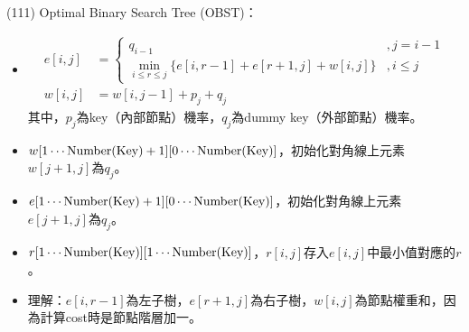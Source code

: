 \item \begin{theorem}{(111)} Optimal Binary Search Tree (OBST)：\begin{itemize}
        \item \begin{equation}
            \begin{aligned}
                e[i, j] & = \begin{cases}
                    q_{i - 1} &, j = i - 1 \\
                    \min_{i \le r \le j}\{e[i, r - 1] + e[r + 1, j] + w[i, j]\} &, i \le j
                \end{cases} \\
                w[i, j] & = w[i, j - 1] + p_j + q_j
            \end{aligned}
        \end{equation} 其中，$p_j$為key（內部節點）機率，$q_j$為dummy key（外部節點）機率。
        \item $w[1 \cdots \operatorname{Number}(\text{Key}) + 1][0 \cdots \operatorname{Number}(\text{Key})]$，初始化對角線上元素$w[j + 1, j]$為$q_j$。
        \item $e[1 \cdots \operatorname{Number}(\text{Key}) + 1][0 \cdots \operatorname{Number}(\text{Key})]$，初始化對角線上元素$e[j + 1, j]$為$q_j$。
        \item $r[1 \cdots \operatorname{Number}(\text{Key})][1 \cdots \operatorname{Number}(\text{Key})]$，$r[i, j]$存入$e[i, j]$中最小值對應的$r$。
        \item 理解：$e[i, r - 1]$為左子樹，$e[r + 1, j]$為右子樹，$w[i, j]$為節點權重和，因為計算cost時是節點階層加一。
    \end{itemize}
\end{theorem}

